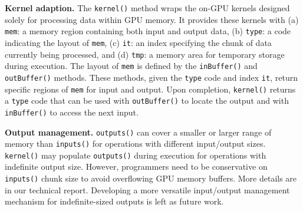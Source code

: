 \begin{comment}
The only way to efficiently process a dataset larger than GPU memory is to do it chunk by chunk, each of which can fit in GPU memory.
\texttt{ExKernel} \textit{maps} the inputs and outputs into \textit{chunks} and ensures that each chunk can fit within a piece of memory sized \texttt{chunkSz}.
The chunks are exposed via \texttt{inputs()} and \texttt{outputs()} methods to the executor.
\texttt{size()} returns how many chunks need to be processed in total.
Note that data in DRAM is not moved during this process as we only establish a mapping table to tell which part of the data belongs to a certain chunk.
A chunk can be either a consecutive memory region or a group of memory regions, as demonstrated at the bottom of Figure~\ref{fig:pipeline-high-level}.
The former can be used when the operation is embarrassingly parallelizable, like adding 1 to all elements.
The latter can be used when the input is the output of another \texttt{ExKernel}, whose examples can be found in our sort (\S\ref{sec:design-sort}) and hash join (\S\ref{sec:design-join}) design.
\end{comment}

\noindent \textbf{Kernel adaption.}
The \texttt{kernel()} method wraps the on-GPU kernels designed solely for processing data within GPU memory. 
It provides these kernels with
(a) \texttt{mem}: a memory region containing both input and output data,
(b) \texttt{type}: a code indicating the layout of \texttt{mem},
(c) \texttt{it}: an index specifying the chunk of data currently being processed, and
(d) \texttt{tmp}: a memory area for temporary storage during execution.
The layout of \texttt{mem} is defined by the \texttt{inBuffer()} and \texttt{outBuffer()} methods. 
These methods, given the \texttt{type} code and index \texttt{it}, return specific regions of \texttt{mem} for input and output.
Upon completion, \texttt{kernel()} returns a \texttt{type} code that can be used with \texttt{outBuffer()} to locate the output and with \texttt{inBuffer()} to access the next input.

\noindent
\textbf{Output management.}
\texttt{outputs()} can cover a smaller or larger range of memory than \texttt{inputs()} for operations with different input/output sizes.
\texttt{kernel()} may populate \texttt{outputs()} during execution for operations with indefinite output size. 
However, programmers need to be conservative on \texttt{inputs()} chunk size to avoid overflowing GPU memory buffers.
More details are in our technical report.
Developing a more versatile input/output management mechanism for indefinite-sized outputs is left as future work.

